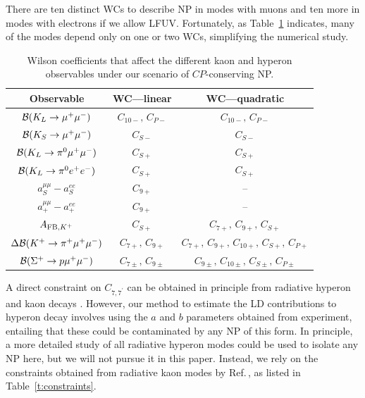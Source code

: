 \documentclass[amsmath,amssymb,aps,nofootinbib,prd,preprint,superscriptaddress,tightenlines,a4paper,bm]{revtex4-2}
\begin{document}
There are ten distinct WCs to describe NP in modes with muons and ten more in modes with electrons if we allow LFUV.
Fortunately, as Table~\ref{t:modescon} indicates, many of the modes depend only on one or two WCs, simplifying the numerical study.

\begin{table}[b] \bigskip
\centering \setlength{\tabcolsep}{1ex}
\begin{tabular}{|c|c|c|} \hline
Observable & WC---linear & WC---quadratic \\ \hline
${\cal B}(K_L\to \mu^+\mu^-)$ & $C_{10-},\,C_{P-}$ & $C_{10-},\,C_{P-}$ \\
${\cal B}(K_S\to \mu^+\mu^-)$ & $C_{S-}$ & $C_{S-}$ \\
${\cal B}(K_L\to \pi^0\mu^+\mu^-)$  & $C_{S+}$ & $C_{S+}$ \\
${\cal B}(K_L\to \pi^0 e^+e^-)$  & $C_{S+}$ & $C_{S+}$ \\
$a_S^{\mu\mu}-a_S^{ee}$ & $C_{9+}$ & -- \\
$a_+^{\mu\mu}-a_+^{ee}$ & $C_{9+}$ & -- \\
$A_{{\rm FB},K^+}$ & $C_{S+}$ & $C_{7+},\, C_{9+},\, C_{S+}$\\
$\Delta{\cal B}(K^+\to\pi^+\mu^+\mu^-)$ & $C_{7+},\, C_{9+}$ & $C_{7+},\, C_{9+},\, C_{10+},\, C_{S+},\, C_{P+}$\\
${\cal B}(\Sigma^+ \to p \mu^+\mu^-) $ & $C_{7\pm},\, C_{9\pm}$ & $C_{9\pm},\, C_{10\pm},\, C_{S\pm},\, C_{P\pm}$
\\ \hline
\end{tabular}
\caption{Wilson coefficients that affect the different kaon and hyperon observables under our scenario of $CP$-conserving NP.}
\label{t:modescon} 
\end{table}

A direct constraint on $C_{7,7^\prime}$ can be obtained in principle from radiative hyperon and kaon decays \cite{He:1999ik,Tandean:1999mg,Mertens:2011ts}.
However, our method to estimate the LD contributions to hyperon decay involves using the $a$ and $b$ parameters obtained from experiment, entailing that these could be contaminated by any NP of this form.
In principle, a more detailed study of all radiative hyperon modes could be used to isolate any NP here, but we will not pursue it in this paper.
Instead, we rely on the constraints obtained from radiative kaon modes by Ref.\,\cite{Mertens:2011ts}, as listed in Table~\ref{t:constraints}.
\end{document}
